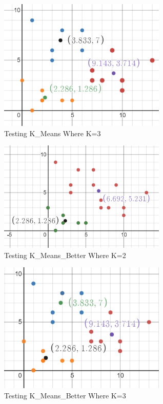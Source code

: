\documentclass[12pt,letterpaper]{article}
\begin{document}
    \begin{figure}[htp]
        \centering
        \includegraphics[width=8cm]{cluster3.PNG}
        \caption{Testing K\_Means Where K=3}
        \label{fig:cluster3}
    \end{figure}
    
    \begin{figure}[htp]
        \centering
        \includegraphics[width=8cm]{bettercluster2.PNG}
        \caption{Testing K\_Means\_Better Where K=2}
        \label{fig:bettercluster2}
    \end{figure}

    \begin{figure}[htp]
        \centering
        \includegraphics[width=8cm]{bettercluster3.PNG}
        \caption{Testing K\_Means\_Better Where K=3}
        \label{fig:bettercluster3}
    \end{figure}
    
\end{document}
